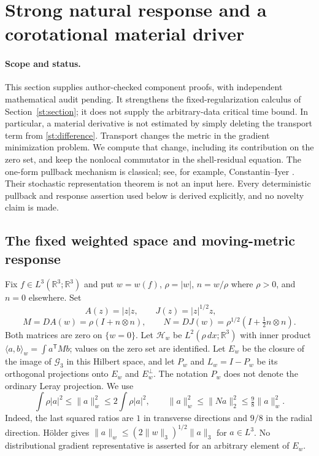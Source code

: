 \section{Strong natural response and a corotational material driver}
\label{mr:section}

\paragraph{Scope and status.}
This section supplies author-checked component proofs, with independent
mathematical audit pending. It strengthens the fixed-regularization
calculus of Section~\ref{st:section}; it does not supply the arbitrary-data
critical time bound. In particular, a material derivative is not estimated
by simply deleting the transport term from \eqref{st:difference}.
Transport changes the metric in the gradient minimization problem. We
compute that change, including its contribution on the zero set, and keep
the nonlocal commutator in the shell-residual equation.
The one-form pullback mechanism is classical; see, for example,
Constantin--Iyer \cite[Lemmas~3.2--3.3]{ConstantinIyer2008}. Their stochastic
representation theorem is not an input here. Every deterministic
pullback and response assertion used below is derived explicitly, and no
novelty claim is made.

\subsection{The fixed weighted space and moving-metric response}

Fix $f\in L^3(\mathbb R^3;\mathbb R^3)$ and put $w=w(f)$,
$\rho=|w|$, $n=w/\rho$ where $\rho>0$, and $n=0$ elsewhere. Set
\[
 A(z)=|z|z,\qquad J(z)=|z|^{1/2}z,\qquad
\]
\[
 M=DA(w)=\rho(I+n\otimes n),\qquad
 N=DJ(w)=\rho^{1/2}(I+\tfrac12 n\otimes n).
\]
Both matrices are zero on $\{w=0\}$. Let $\mathcal H_w$ be
$L^2(\rho\,dx;\mathbb R^3)$ with inner product
$\langle a,b\rangle_w=\int a^{\mathsf T}Mb$; values on the zero
set are identified. Let $E_w$ be the closure of the image of
$\mathcal G_3$ in this Hilbert space, and let $P_w$ and $L_w=I-P_w$
be its orthogonal projections onto $E_w$ and $E_w^\perp$.
The notation $P_w$ does not denote the ordinary Leray projection.
We use
\begin{equation}\label{mr:matrix}
 \int\rho|a|^2\le\|a\|_w^2\le2\int\rho|a|^2,
 \qquad
 \|a\|_w^2\le\|Na\|_2^2\le\tfrac98\|a\|_w^2.
\end{equation}
Indeed, the last squared ratios are $1$ in transverse directions and
$9/8$ in the radial direction. H\"older gives
$\|a\|_w\le(2\|w\|_3)^{1/2}\|a\|_3$ for $a\in L^3$.
No distributional gradient representative is asserted for an arbitrary
element of $E_w$.

